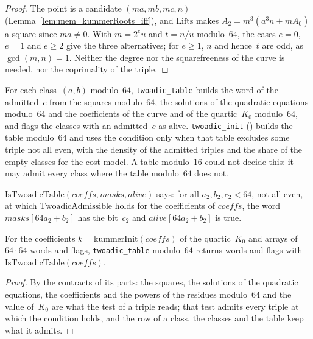 \begin{proof}
  \leanok
  The point is a candidate $(m a, m b, m c, n)$ (Lemma~\ref{lem:mem_kummerRoots_iff}), and
  $\mathrm{Lifts}$ makes $A_2 = m^3 (a^3 n + m A_0)$ a square since $m a \ne 0$. With $m = 2^e u$
  and $t = n / u$ modulo~$64$, the cases $e = 0$, $e = 1$ and $e \ge 2$ give the three alternatives;
  for $e \ge 1$, $n$ and hence~$t$ are odd, as $\gcd(m, n) = 1$. Neither the degree nor the
  squarefreeness of the curve is needed, nor the coprimality of the triple.
\end{proof}

For each class~$(a, b)$ modulo~$64$, \texttt{twoadic\_table} builds
the word of the admitted~$c$ from the squares modulo~$64$, the solutions of the quadratic equations
modulo~$64$ and the coefficients of the curve and of the quartic~$K_0$ modulo~$64$, and flags the
classes with an admitted~$c$ as alive. \texttt{twoadic\_init} ()
builds the table modulo~$64$ and uses the condition only when that table excludes some triple not
all even, with the density of the admitted triples and the share of the empty classes for the cost
model. A table modulo~$16$ could not decide this: it may admit every class where the table
modulo~$64$ does not.

\begin{definition}\label{def:IsTwoadicTable}
  \leanok
  $\mathrm{IsTwoadicTable}(\mathit{coeffs}, \mathit{masks}, \mathit{alive})$ says: for all
  $a_2, b_2, c_2 < 64$, not all even, at which $\mathrm{TwoadicAdmissible}$ holds for the
  coefficients of $\mathit{coeffs}$, the word $\mathit{masks}[64 a_2 + b_2]$ has the bit~$c_2$ and
  $\mathit{alive}[64 a_2 + b_2]$ is true.
\end{definition}

\begin{lemma}\label{lem:twoadicTable_spec}
  \leanok
  For the coefficients $k = \mathrm{kummerInit}(\mathit{coeffs})$ of the quartic~$K_0$ and arrays of
  $64 \cdot 64$ words and flags, \texttt{twoadic\_table} modulo~$64$ returns words and flags with
  $\mathrm{IsTwoadicTable}(\mathit{coeffs})$.
\end{lemma}

\begin{proof}
  \leanok
  By the contracts of its parts: the squares, the solutions of the quadratic equations, the
  coefficients and the powers of the residues modulo~$64$ and the value of~$K_0$ are what the test
  of a triple reads; that test admits every triple at which the condition holds, and the row of a
  class, the classes and the table keep what it admits.
\end{proof}

